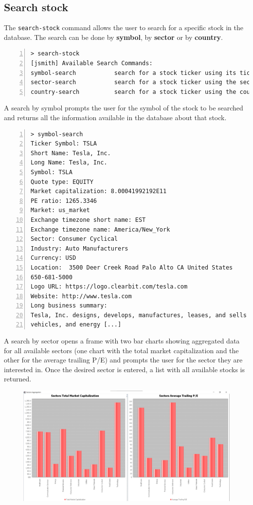 \subsection{Search stock}
The \texttt{search-stock} command allows the user to search for a specific stock in the database. The search can be done by \textbf{symbol}, by \textbf{sector} or by \textbf{country}.
\begin{lstlisting}[basicstyle=\footnotesize\ttfamily,language={},numbers=left,keepspaces=true,tabsize=4,
numberstyle=\footnotesize,numbersep=8pt,frame=single]
> search-stock
[jsmith] Available Search Commands:
symbol-search			search for a stock ticker using its ticker.
sector-search			search for a stock ticker using the sector.
country-search			search for a stock ticker using the country.
\end{lstlisting}
\vspace{-0.5cm}
A search by symbol prompts the user for the symbol of the stock to be searched and returns all the information available in the database about that stock.
\vspace{0.2cm}
\begin{lstlisting}[basicstyle=\footnotesize\ttfamily,language={},numbers=left,keepspaces=true,tabsize=4,
numberstyle=\footnotesize,numbersep=8pt,frame=single]
> symbol-search
Ticker Symbol: TSLA
Short Name: Tesla, Inc.
Long Name: Tesla, Inc.
Symbol: TSLA
Quote type: EQUITY
Market capitalization: 8.00041992192E11
PE ratio: 1265.3346
Market: us_market
Exchange timezone short name: EST
Exchange timezone name: America/New_York
Sector: Consumer Cyclical
Industry: Auto Manufacturers
Currency: USD
Location:  3500 Deer Creek Road Palo Alto CA United States
650-681-5000
Logo URL: https://logo.clearbit.com/tesla.com
Website: http://www.tesla.com
Long business summary:
Tesla, Inc. designs, develops, manufactures, leases, and sells electric
vehicles, and energy [...]
\end{lstlisting}
A search by sector opens a frame with two bar charts showing aggregated data for
all available sectors (one chart with the total market capitalization and the
other for the average trailing P/E) and prompts the user for the sector they are
interested in. Once the desired sector is entered, a list with all available
stocks is returned.
\begin{figure}[H]
	\begin{center}
		\includegraphics[scale=0.29]{img/user_manual/sectors_aggregation.png}
	\end{center}
\end{figure}
